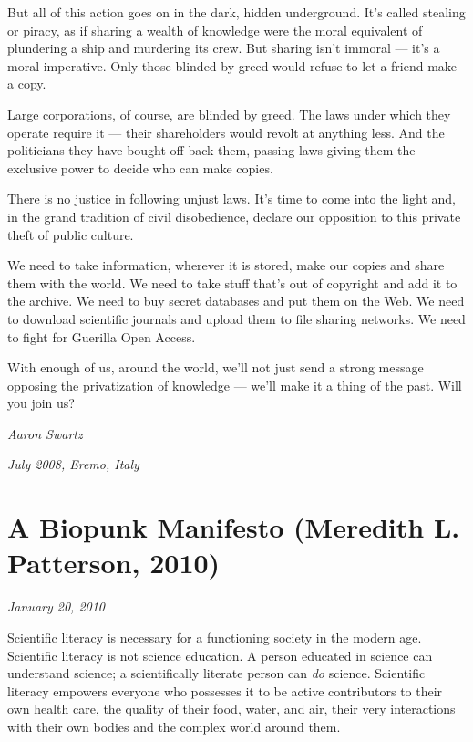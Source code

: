 \documentclass[letterpaper,12pt,english]{sphinxmanual}
\begin{document}
But all of this action goes on in the dark, hidden underground. It's called stealing or piracy, as if sharing a wealth of knowledge were the moral equivalent of plundering a ship and murdering its crew. But sharing isn't immoral — it's a moral imperative. Only those blinded by greed would refuse to let a friend make a copy.

Large corporations, of course, are blinded by greed. The laws under which they operate require it — their shareholders would revolt at anything less. And the politicians they have bought off back them, passing laws giving them the exclusive power to decide who can make copies.

There is no justice in following unjust laws. It's time to come into the light and, in the grand tradition of civil disobedience, declare our opposition to this private theft of public culture.

We need to take information, wherever it is stored, make our copies and share them with the world. We need to take stuff that's out of copyright and add it to the archive. We need to buy secret databases and put them on the Web. We need to download scientific journals and upload them to file sharing networks. We need to fight for Guerilla Open Access.

With enough of us, around the world, we'll not just send a strong message opposing the privatization of knowledge — we'll make it a thing of the past. Will you join us?

\emph{Aaron Swartz}

\emph{July 2008, Eremo, Italy}


\chapter{A Biopunk Manifesto (Meredith L. Patterson, 2010)}
\label{2010::doc}\label{2010:a-biopunk-manifesto-meredith-l-patterson-2010}
\emph{January 20, 2010}

Scientific literacy is necessary for a functioning society in the modern age. Scientific literacy is not science education. A person educated in science can understand science; a scientifically literate person can \emph{do} science. Scientific literacy empowers everyone who possesses it to be active contributors to their own health care, the quality of their food, water, and air, their very interactions with their own bodies and the complex world around them.
\end{document}
